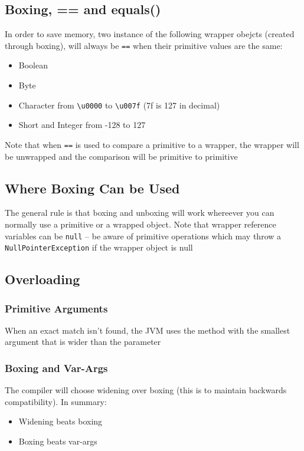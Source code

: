 \subsection{Boxing, == and equals()}
In order to save memory, two instance of the following wrapper obejcts (created 
through boxing), will always be \verb#==# when their primitive values are the 
same:
\begin{itemize}
    \item Boolean
    \item Byte
    \item Character from \verb#\u0000# to \verb#\u007f# (7f is 127 in decimal)
    \item Short and Integer from -128 to 127
\end{itemize}
Note that when \verb#==# is used to compare a primitive to a wrapper, the 
wrapper will be unwrapped and the comparison will be primitive to primitive

\subsection{Where Boxing Can be Used}
The general rule is that boxing and unboxing will work whereever you can 
normally use a primitive or a wrapped object. Note that wrapper reference 
variables can be \verb#null# -- be aware of primitive operations which may 
throw a \verb#NullPointerException# if the wrapper object is null

\subsection{Overloading}
\subsubsection{Primitive Arguments}
When an exact match isn't found, the JVM uses the method with the smallest 
argument that is wider than the parameter

\subsubsection{Boxing and Var-Args}
The compiler will choose widening over boxing (this is to maintain backwards 
compatibility). In summary:
\begin{itemize}
    \item Widening beats boxing
    \item Boxing beats var-args
\end{itemize}

